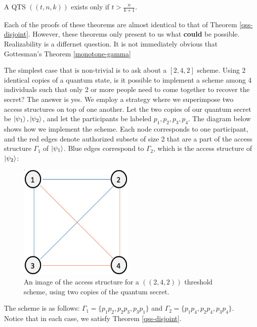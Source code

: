 \begin{theorem}
	\label{qtsk}
	A QTS $((t,n, k))$ exists only if $t > \frac{n}{k+1}$.
\end{theorem}

Each of the proofs of these theorems are almost identical to that of Theorem \ref{qss-disjoint}. However, these theorems only present to us what \textbf{could} be possible. Realizability is a differnet question. It is not immediately obvious that Gottesman's Theorem \ref{monotone-gamma}

The simplest case that is non-trivial is to ask about a $[2,4,2]$ scheme. Using 2 identical copies of a quantum state, is it possible to implement a scheme among 4 individuals such that only 2 or more people need to come together to recover the secret? The answer is yes. We employ a strategy where we superimpose two access structures on top of one another. Let the two copies of our quantum secret be $\ket{\psi_1}, \ket{\psi_2}$, and let the participants be labeled $p_1, p_2, p_3, p_4$. The diagram below shows how we implement the scheme. Each node corresponds to one participant, and the red edges denote authorized subsets of size 2 that are a part of the access structure $\Gamma_1$ of $\ket{\psi_1}$. Blue edges correspond to $\Gamma_2$, which is the access structure of $\ket{\psi_2}$:


\begin{figure}[h]
	\label{fig:2-4-2}
	\begin{center}
		\includegraphics[width=0.5\textwidth]{Images/ch3-fig1.png}
	\end{center}
	\caption{An image of the access structure for a $((2,4,2))$ threshold scheme, using two copies of the quantum secret.}
\end{figure}


The scheme is as follows: $\Gamma_1 = \{p_1p_2,p_2p_3,p_3p_1\}$ and $\Gamma_2 = \{p_1p_4,p_2p_4,p_3p_4\}$. Notice that in each case, we satisfy Theorem \ref{qss-disjoint}.

